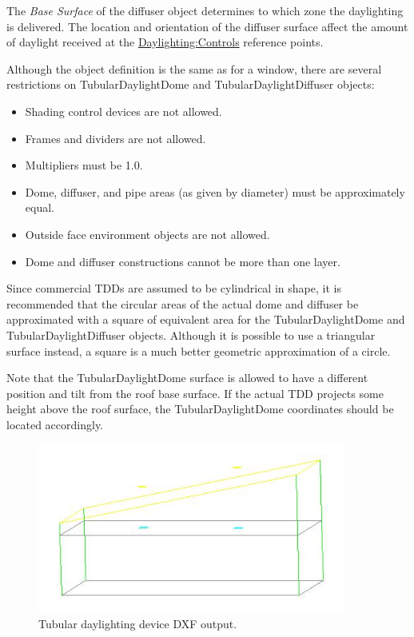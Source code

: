 The \emph{Base Surface} of the diffuser object determines to which zone the daylighting is delivered. The location and orientation of the diffuser surface affect the amount of daylight received at the \hyperref[daylightingcontrols-000]{Daylighting:Controls} reference points.

Although the object definition is the same as for a window, there are several restrictions on TubularDaylightDome and TubularDaylightDiffuser objects:

\begin{itemize}
\item
  Shading control devices are not allowed.
\item
  Frames and dividers are not allowed.
\item
  Multipliers must be 1.0.
\item
  Dome, diffuser, and pipe areas (as given by diameter) must be approximately equal.
\item
  Outside face environment objects are not allowed.
\item
  Dome and diffuser constructions cannot be more than one layer.
\end{itemize}

Since commercial TDDs are assumed to be cylindrical in shape, it is recommended that the circular areas of the actual dome and diffuser be approximated with a square of equivalent area for the TubularDaylightDome and TubularDaylightDiffuser objects. Although it is possible to use a triangular surface instead, a square is a much better geometric approximation of a circle.

Note that the TubularDaylightDome surface is allowed to have a different position and tilt from the roof base surface. If the actual TDD projects some height above the roof surface, the TubularDaylightDome coordinates should be located accordingly.

\begin{figure}[hbtp] %
\centering
\includegraphics[width=0.9\textwidth, height=0.9\textheight, keepaspectratio=true]{media/image109.png}
\caption{Tubular daylighting device DXF output. \protect \label{fig:tubular-daylighting-device-dxf-output.}}
\end{figure}

